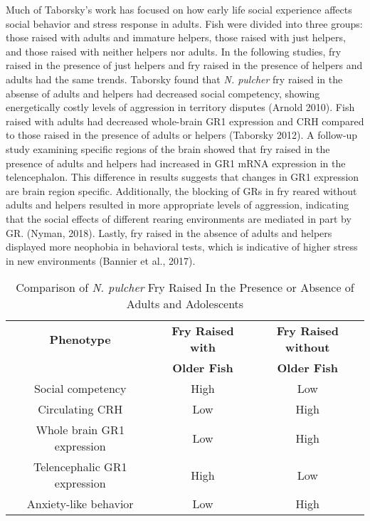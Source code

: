 \documentclass[12pt,twoside]{reedthesis}
\begin{document}
Much of Taborsky's work has focused on
how early life social experience affects social behavior and stress response in
adults. Fish were divided into three groups: those raised with adults and
immature helpers, those raised with just helpers, and those raised with neither
helpers nor adults. In the following studies, fry raised in the presence of just
helpers and fry raised in the presence of helpers and adults had the same
trends. Taborsky found that \textit{N. pulcher} fry raised in the
absense of adults and helpers had decreased social competency, showing
energetically costly levels of aggression in territory disputes (Arnold 2010). Fish raised with adults had decreased whole-brain GR1
expression and CRH compared to those raised in the presence of adults or helpers
(Taborsky 2012). A follow-up study examining specific regions of the brain
showed that fry raised in the presence of adults and helpers had increased in
GR1 mRNA expression in the telencephalon. This difference in results suggests
that changes in GR1 expression are brain region specific. Additionally, the blocking of GRs in fry reared without adults and helpers resulted in more appropriate
levels of aggression, indicating that the social effects of different rearing
environments are mediated in part by GR. (Nyman, 2018). Lastly, fry raised in
the absence of adults and helpers displayed more neophobia in behavioral tests,
which is indicative of higher stress in new environments (Bannier et al., 2017). 

\begin{table}[htbp]
\caption[Comparison of \textit{N. pulcher} Fry Raised In the Presence or Absence
of Adults and Adolescents]{Comparison of \textit{N. pulcher} Fry Raised In the Presence or Absence
of Adults and Adolescents}
\begin{center}
\footnotesize
\begin{tabular}{ | c | c | c | }
  \hline
  \textbf{Phenotype} & \textbf{Fry Raised with} & \textbf{Fry Raised without} \\
  & \textbf{Older Fish} & \textbf{Older Fish} \\
\hline
  Social competency & High & Low\\
\hline
  Circulating CRH & Low & High\\
\hline
  Whole brain GR1 expression & Low & High\\
\hline
  Telencephalic GR1 expression & High & Low\\
\hline
  Anxiety-like behavior & Low & High\\
\hline
\end{tabular}
\end{center}
\end{table}
\end{document}
